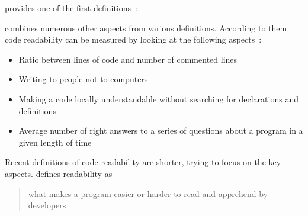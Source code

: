 \documentclass[%
class=scrreprt,
chapterprefix=false,%
open=right,%
twoside=false,%
paper=a4,%
logofile={Logo\_zentral\_farbig\_EN.png},%
thesistype=master,%
UKenglish,%
]{se2thesis}
\theoremstyle{definition}
\begin{document}
	

	
	\citeauthor{buse2009learning} provides one of the first definitions~\cite{buse2009learning}:

	\citeauthor{tashtoush2013impact} combines numerous other aspects from various definitions. According to them code readability can be measured by looking at the following aspects~\cite{tashtoush2013impact}:
	\begin{itemize}
		\item Ratio between lines of code and number of commented lines
		\item Writing to people not to computers
		\item Making a code locally understandable without searching for declarations and definitions
		\item Average number of right answers to a series of questions about a program in a given length of time
	\end{itemize}
	
	Recent definitions of code readability are shorter, trying to focus on the key aspects. \citeauthor{oliveira2020evaluating} defines readability as
	\blockcquote{oliveira2020evaluating}{what makes a program easier or harder to read and apprehend by developers}.
			
\end{document}

